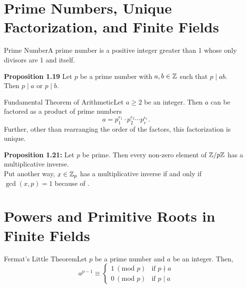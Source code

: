 \renewcommand{\theenumi}{\arabic{enumi}}
\renewcommand{\labelenumi}{\theenumi.}
\section{Prime Numbers, Unique Factorization, and Finite Fields}

\begin{definition}
    {Prime Number}A prime number is a positive integer greater than 1 whose only divisors are 1 and itself.
\end{definition}

\textbf{Proposition 1.19} Let \(p\) be a prime number with \(a,b \in \mathbb{Z}\) such that \(p \mid ab\). \\
Then \(p \mid a\) or \(p \mid b\). \\

\begin{theorem}
    {Fundamental Theorem of Arithmetic}Let \(a \geq 2\) be an integer. Then \(a\) can be factored as a product of prime numbers \[a = p_1^{e_1} \cdot p_2^{e_2} \cdots p_r^{e_r}.\] Further, other than rearranging the order of the factors, this factorization is unique.
\end{theorem}

\textbf{Proposition 1.21:} Let \(p\) be prime. Then every non-zero element of \(\mathbb{Z}/p\mathbb{Z}\) has a multiplicative inverse. \\

Put another way, \(x \in \mathbb{Z}_p\) has a multiplicative inverse if and only if \(\gcd(x,p) = 1\) because of . \\


\pfs%

\renewcommand{\theenumi}{\arabic{enumi}}
\renewcommand{\labelenumi}{\theenumi.}
\section{Powers and Primitive Roots in Finite Fields}
\label{thm:Fermat's Little Theorem}

\begin{theorem}
    {Fermat's Little Theorem}Let \(p\) be a prime number and \(a\) be an integer. Then, \[a^{p - 1} \equiv \begin{cases}
            1 \ (\text{mod } p) & \text{if } p \nmid a \\
            0 \ (\text{mod } p) & \text{if } p \mid a
        \end{cases}\]
\end{theorem}

